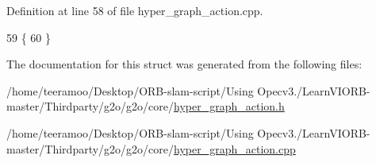 Definition at line 58 of file hyper\+\_\+graph\+\_\+action.\+cpp.


\begin{DoxyCode}
59   \{
60   \}
\end{DoxyCode}


The documentation for this struct was generated from the following files\+:\begin{DoxyCompactItemize}
\item 
/home/teeramoo/\+Desktop/\+O\+R\+B-\/slam-\/script/\+Using Opecv3./\+Learn\+V\+I\+O\+R\+B-\/master/\+Thirdparty/g2o/g2o/core/\hyperlink{hyper__graph__action_8h}{hyper\+\_\+graph\+\_\+action.\+h}\item 
/home/teeramoo/\+Desktop/\+O\+R\+B-\/slam-\/script/\+Using Opecv3./\+Learn\+V\+I\+O\+R\+B-\/master/\+Thirdparty/g2o/g2o/core/\hyperlink{hyper__graph__action_8cpp}{hyper\+\_\+graph\+\_\+action.\+cpp}\end{DoxyCompactItemize}

